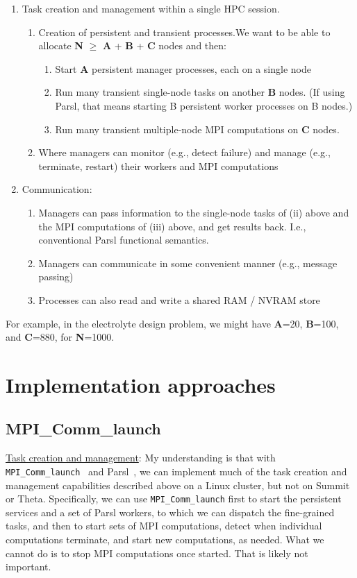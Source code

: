 \documentclass[10pt]{article}
\begin{document}
\begin{enumerate}
\item
Task creation and management within a single HPC session.
\begin{enumerate}
\item Creation of persistent and transient processes.We want to be able to allocate \textbf{N} $\ge$  \textbf{A} +  \textbf{B} +  \textbf{C} nodes and then:
\begin{enumerate}
\item
Start  \textbf{A} persistent manager processes, each on a single node
\item
Run many transient single-node tasks on another \textbf{B} nodes. (If using Parsl, that means starting B persistent worker processes on B nodes.)
\item
Run many transient multiple-node MPI computations on  \textbf{C} nodes.
\end{enumerate}
\item
Where managers can monitor (e.g., detect failure) and manage (e.g., terminate, restart) their workers and MPI computations
\end{enumerate}
\item
Communication:
\begin{enumerate}
\item
Managers can pass information to the single-node tasks of (ii) above and the MPI computations of (iii) above, and get results back. I.e., conventional Parsl functional semantics.
\item
Managers can communicate in some convenient manner (e.g., message passing)
\item
Processes can also read and write a shared RAM / NVRAM store
\end{enumerate}
\end{enumerate}

For example, in the electrolyte design problem, we might have \textbf{A}=20, \textbf{B}=100, and \textbf{C}=880, for \textbf{N}=1000.


\section{Implementation approaches}

\subsection{MPI\_Comm\_launch}

\underline{Task creation and management}: 
My understanding is that with \texttt{MPI\_Comm\_launch}~\cite{wozniak2019mpi} and Parsl~\cite{babuji19parsl}, 
we can implement much of the task creation and management capabilities described above on a Linux cluster, but not on Summit or Theta.
Specifically, we can use \texttt{MPI\_Comm\_launch} first to start the persistent services and a set of Parsl workers, to which we can dispatch the fine-grained tasks,
and then to start sets of MPI computations, detect when individual computations terminate, and start new computations, as needed.
What we cannot do is to stop MPI computations once started. That is likely not important.
\end{document}

